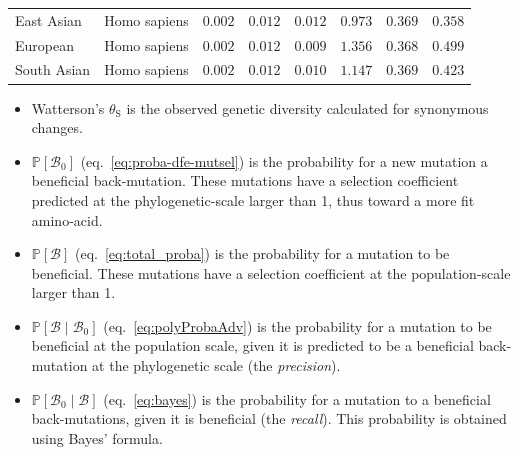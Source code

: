 \documentclass[12pt]{article}
\newcommand{\proba}{\mathbb{P}}
\newcommand{\SphyBen}{\mathcal{B}_0}
\newcommand{\given}{\mid}
\newcommand{\SpopBen}{\mathcal{B}}
\newcommand{\thetaSyn}{\theta_{\text{S}}}
\begin{document}
\begin{center}
\begin{longtable*}{|l|l|r|r|r|r|r|r|}
            East Asian &        Homo sapiens &               $ 0.002$ &              $ 0.012$ &              $ 0.012$ &                                          $ 0.973$ &                         $ 0.369$ &                      $ 0.358$ \\
            European &        Homo sapiens &               $ 0.002$ &              $ 0.012$ &              $ 0.009$ &                                          $ 1.356$ &                         $ 0.368$ &                      $ 0.499$ \\
            South Asian &        Homo sapiens &               $ 0.002$ &              $ 0.012$ &              $ 0.010$ &                                          $ 1.147$ &                         $ 0.369$ &                      $ 0.423$ \\
        \end{longtable*}
    \end{center}
    \begin{itemize}
        \item Watterson's $\thetaSyn$ is the observed genetic diversity calculated for synonymous changes.
        \item $\proba [ \SphyBen ]$ (eq.~\ref{eq:proba-dfe-mutsel}) is the probability for a new mutation a beneficial back-mutation.
        These mutations have a selection coefficient predicted at the phylogenetic-scale larger than 1, thus toward a more fit amino-acid.
        \item $\proba [ \SpopBen ]$ (eq.~\ref{eq:total_proba}) is the probability for a mutation to be beneficial.
        These mutations have a selection coefficient at the population-scale larger than 1.
        \item $\proba [ \SpopBen \given \SphyBen]$ (eq.~\ref{eq:polyProbaAdv}) is the probability for a mutation to be beneficial at the population scale, given it is predicted to be a beneficial back-mutation at the phylogenetic scale (the \textit{precision}).
        \item $\proba [ \SphyBen \given \SpopBen]$ (eq.~\ref{eq:bayes}) is the probability for a mutation to a beneficial back-mutations, given it is beneficial (the \textit{recall}).
        This probability is obtained using Bayes' formula.
    \end{itemize}
    \newpage
\end{document}
